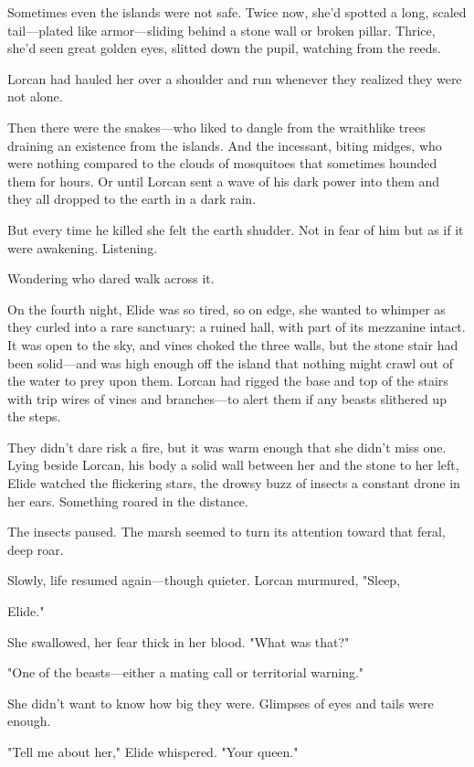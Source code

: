 Sometimes even the islands were not safe. Twice now, she'd spotted a long, scaled tail---plated like armor---sliding behind a stone wall or broken pillar. Thrice, she'd seen great golden eyes, slitted down the pupil, watching from the reeds.

Lorcan had hauled her over a shoulder and run whenever they realized they were not alone.

Then there were the snakes---who liked to dangle from the wraithlike trees draining an existence from the islands. And the incessant, biting midges, who were nothing compared to the clouds of mosquitoes that sometimes hounded them for hours. Or until Lorcan sent a wave of his dark power into them and they all dropped to the earth in a dark rain.

But every time he killed  she felt the earth shudder. Not in fear of him  but as if it were awakening. Listening.

Wondering who dared walk across it.

On the fourth night, Elide was so tired, so on edge, she wanted to whimper as they curled into a rare sanctuary: a ruined hall, with part of its mezzanine intact. It was open to the sky, and vines choked the three walls, but the stone stair had been solid---and was high enough off the island that nothing might crawl out of the water to prey upon them. Lorcan had rigged the base and top of the stairs with trip wires of vines and branches---to alert them if any beasts slithered up the steps.

They didn't dare risk a fire, but it was warm enough that she didn't miss one. Lying beside Lorcan, his body a solid wall between her and the stone to her left, Elide watched the flickering stars, the drowsy buzz of insects a constant drone in her ears. Something roared in the distance.

The insects paused. The marsh seemed to turn its attention toward that feral, deep roar.

Slowly, life resumed again---though quieter. Lorcan murmured, "Sleep,

Elide."

She swallowed, her fear thick in her blood. "What was that?"

"One of the beasts---either a mating call or territorial warning."

She didn't want to know how big they were. Glimpses of eyes and tails were enough.

"Tell me about her," Elide whispered. "Your queen."

